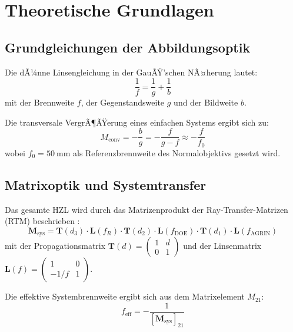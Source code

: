 ﻿\documentclass[12pt,a4paper]{article}
\theoremstyle{definition}
\newcommand{\conv}{\mathrm{conv}}
\newcommand{\eff}{\mathrm{eff}}
\newcommand{\AGRIN}{\mathrm{AGRIN}}
\newcommand{\DOE}{\mathrm{DOE}}
\begin{document}
	\section{Theoretische Grundlagen}
	
	\subsection{Grundgleichungen der Abbildungsoptik}
	
	Die dÃ¼nne Linsengleichung in der GauÃŸ'schen NÃ¤herung lautet:
	\begin{equation}
		\frac{1}{f} = \frac{1}{g} + \frac{1}{b}
		\label{eq:thin_lens}
	\end{equation}
	mit der Brennweite $f$, der Gegenstandsweite $g$ und der Bildweite $b$.
	
	Die transversale VergrÃ¶ÃŸerung eines einfachen Systems ergibt sich zu:
	\begin{equation}
		M_\conv = -\frac{b}{g} = -\frac{f}{g - f}
		\approx -\frac{f}{f_0}
		\label{eq:mag_conv}
	\end{equation}
	wobei $f_0 = \SI{50}{\milli\metre}$ als Referenzbrennweite des Normalob\-jektivs
	gesetzt wird.
	
	\subsection{Matrixoptik und Systemtransfer}
	
	Das gesamte HZL wird durch das Matrizenprodukt der Ray-Transfer-Matrizen
	(RTM) beschrieben \cite{saleh2007fundamentals}:
	\begin{equation}
		\mathbf{M}_\mathrm{sys} =
		\mathbf{T}(d_3)\cdot\mathbf{L}(f_R)\cdot\mathbf{T}(d_2)\cdot
		\mathbf{L}(f_\DOE)\cdot\mathbf{T}(d_1)\cdot\mathbf{L}(f_\AGRIN)
		\label{eq:rtm}
	\end{equation}
	mit der Propagationsmatrix
	\(
	\mathbf{T}(d) = \begin{pmatrix}1 & d \\ 0 & 1\end{pmatrix}
	\)
	und der Linsenmatrix
	\(
	\mathbf{L}(f) = \begin{pmatrix}1 & 0 \\ -1/f & 1\end{pmatrix}.
	\)
	
	Die effektive Systembrennweite ergibt sich aus dem Matrixelement $M_{21}$:
	\begin{equation}
		f_\eff = -\frac{1}{[\mathbf{M}_\mathrm{sys}]_{21}}
		\label{eq:f_eff}
	\end{equation}
	
\end{document}
